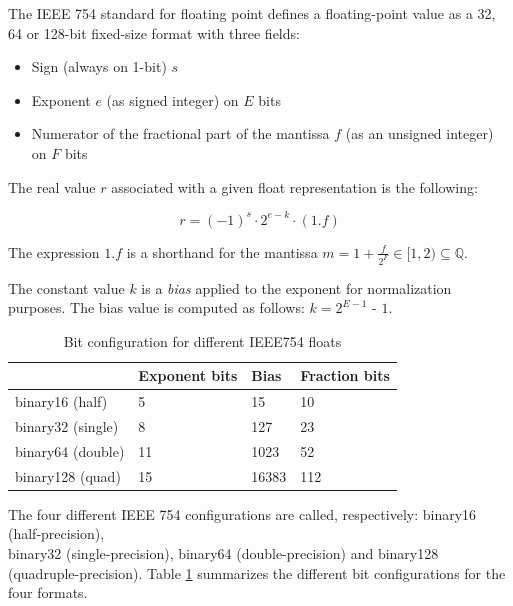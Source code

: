 The IEEE 754 standard for floating point \cite{893287} defines a floating-point value as a 32, 64 or 128-bit fixed-size format with three fields:
\begin{itemize}
    \item Sign (always on 1-bit) $s$
    \item Exponent $e$ (as signed integer) on $E$ bits
    \item Numerator of the fractional part of the mantissa $f$ (as an unsigned integer) on $F$ bits
\end{itemize}

The real value $r$ associated with a given float representation is the following:

\begin{equation}\label{eqn:float2real}
    r = (-1)^s \cdot 2^{e-k} \cdot (1.f)
\end{equation}

The expression $1.f$ is a shorthand for the mantissa $m = 1 + \frac{f}{2^F} \in [1,2) \subseteq \mathbb{Q}$.

The constant value $k$ is a \textit{bias} applied to the exponent for normalization purposes. The bias value is computed as follows: $k = 2^{E-1}$ - $1$.



\begin{table}[b]
\centering
\caption{Bit configuration for different IEEE754 floats}
\label{tab:ieee754configs}
\begin{tabular}{l|lll}
\hline
          & Exponent bits & Bias  & Fraction bits \\ \hline
binary16 (half) &  5             & 15    & 10            \\ \hline
binary32 (single) & 8             & 127   & 23            \\ \hline
binary64 (double) & 11            & 1023  & 52            \\ \hline
binary128 (quad) & 15            & 16383 & 112           \\ \hline
\end{tabular}
\end{table}

The four different IEEE 754 configurations are called, respectively: binary16 (half-precision), \\binary32 (single-precision), binary64 (double-precision) and binary128 (quadruple-precision). Table \ref{tab:ieee754configs} summarizes the different bit configurations for the four formats.

